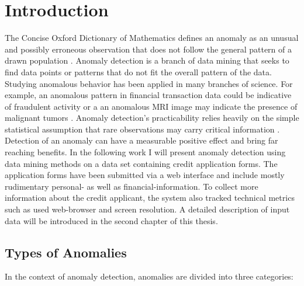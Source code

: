 
\chapter{Introduction}

The Concise Oxford Dictionary of Mathematics defines an anomaly as an unusual and possibly erroneous observation that does not follow the general pattern of a drawn population \cite{Clapham:2013:LAD}. Anomaly detection is a branch of data mining that seeks to find data points or patterns that do not fit the overall pattern of the data. Studying anomalous behavior has been applied in many branches of science. For example, an anomalous pattern in financial transaction data could be indicative of fraudulent activity or a an anomalous MRI image may indicate the presence of malignant tumors \cite{Spence:2001:DSC:882464.882797}. Anomaly detection's practicability relies heavily on the simple statistical assumption that rare observations may carry critical information \cite{Chandola:2009:ADS:1541880.1541882}. Detection of an anomaly can have a measurable positive effect and bring far reaching benefits. In the following work I will present anomaly detection using data mining methods on a data set containing credit application forms. The application forms have been submitted via a web interface and include mostly rudimentary personal- as well as financial-information. To collect more information about the credit applicant, the system also tracked technical metrics such as used web-browser and screen resolution. A detailed description of input data will be introduced in the second chapter of this thesis.


\section{Types of Anomalies}

In the context of anomaly detection, anomalies are divided into three categories:


